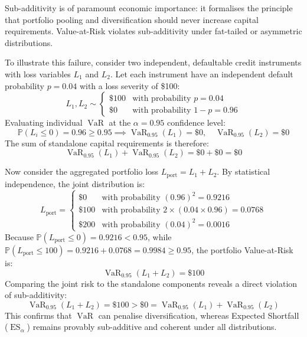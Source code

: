 \documentclass{article}
\theoremstyle{plain}
\theoremstyle{definition}
\theoremstyle{remark}
\DeclareMathOperator{\VaR}{VaR}
\DeclareMathOperator{\ES}{ES}
\begin{document}
Sub-additivity is of paramount economic importance: it formalises the principle that portfolio pooling and diversification should never increase capital requirements. Value-at-Risk violates sub-additivity under fat-tailed or asymmetric distributions.

To illustrate this failure, consider two independent, defaultable credit instruments with loss variables $L_1$ and $L_2$. Let each instrument have an independent default probability $p = 0.04$ with a loss severity of \$100:
\begin{equation}
    L_1, L_2 \sim \begin{cases} \$100 & \text{with probability } p = 0.04 \\ \$0 & \text{with probability } 1 - p = 0.96 \end{cases}
\end{equation}
Evaluating individual $\VaR$ at the $\alpha = 0.95$ confidence level:
\begin{equation}
    \mathbb{P}(L_i \le 0) = 0.96 \ge 0.95 \implies \VaR_{0.95}(L_1) = \$0, \quad \VaR_{0.95}(L_2) = \$0
\end{equation}
The sum of standalone capital requirements is therefore:
\begin{equation}
    \VaR_{0.95}(L_1) + \VaR_{0.95}(L_2) = \$0 + \$0 = \$0
\end{equation}

Now consider the aggregated portfolio loss $L_{\text{port}} = L_1 + L_2$. By statistical independence, the joint distribution is:
\begin{equation}
    L_{\text{port}} = \begin{cases} 
        \$0 & \text{with probability } (0.96)^2 = 0.9216 \\ 
        \$100 & \text{with probability } 2 \times (0.04 \times 0.96) = 0.0768 \\ 
        \$200 & \text{with probability } (0.04)^2 = 0.0016 
    \end{cases}
\end{equation}
Because $\mathbb{P}(L_{\text{port}} \le 0) = 0.9216 < 0.95$, while $\mathbb{P}(L_{\text{port}} \le 100) = 0.9216 + 0.0768 = 0.9984 \ge 0.95$, the portfolio Value-at-Risk is:
\begin{equation}
    \VaR_{0.95}(L_1 + L_2) = \$100
\end{equation}
Comparing the joint risk to the standalone components reveals a direct violation of sub-additivity:
\begin{equation}
    \VaR_{0.95}(L_1 + L_2) = \$100 > \$0 = \VaR_{0.95}(L_1) + \VaR_{0.95}(L_2)
\end{equation}
This confirms that $\VaR$ can penalise diversification, whereas Expected Shortfall ($\ES_\alpha$) remains provably sub-additive and coherent under all distributions.
\end{document}
